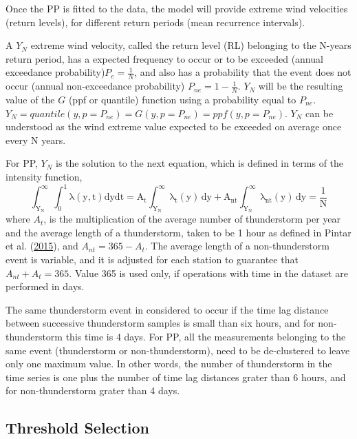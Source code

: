 \documentclass[12pt,oneside]{reedthesis}
\begin{document}
Once the PP is fitted to the data, the model will provide extreme wind velocities (return levels), for different return periods (mean recurrence intervals).

A \(Y_N\) extreme wind velocity, called the return level (RL) belonging to the N-years return period, has a expected frequency to occur or to be exceeded (annual exceedance probability)\(P_e = \frac{1}{N}\), and also has a probability that the event does not occur (annual non-exceedance probability) \(P_{ne}=1-\frac{1}{N}\). \(Y_N\) will be the resulting value of the \(G\) (ppf or quantile) function using a probability equal to \(P_{ne}\). \(Y_N=quantile(y, p=P_{ne})=G(y,p=P_{ne})=ppf(y,p=P_{ne})\). \(Y_N\) can be understood as the wind extreme value expected to be exceeded on average once every N years.

For PP, \(Y_N\) is the solution to the next equation, which is defined in terms of the intensity function,
\begin{equation}
  \mathrm{
          \int_{Y_N}^{\infty}\int_0^1\lambda\left( y,t\right)dydt = A_t\int_{Y_N}^{\infty}\lambda_t\left( y\right)\,dy + A_{nt}\int_{Y_N}^{\infty}\lambda_{nt}\left( y\right)\,dy = \frac{1}{N}
         }
  \label{eq:pprl}
\end{equation}
where \(A_t\), is the multiplication of the average number of thunderstorm per year and the average length of a thunderstorm, taken to be 1 hour as defined in Pintar et al. (\protect\hyperlink{ref-Pintar2015}{2015}), and \(A_{nt} = 365 - A_t\). The average length of a non-thunderstorm event is variable, and it is adjusted for each station to guarantee that \(A_{nt} + A_t = 365\). Value 365 is used only, if operations with time in the dataset are performed in days.

The same thunderstorm event in considered to occur if the time lag distance between successive thunderstorm samples is small than six hours, and for non-thunderstorm this time is 4 days. For PP, all the measurements belonging to the same event (thunderstorm or non-thunderstorm), need to be de-clustered to leave only one maximum value. In other words, the number of thunderstorm in the time series is one plus the number of time lag distances grater than 6 hours, and for non-thunderstorm grater than 4 days.

\hypertarget{thresholdselection}{%
\subsection{Threshold Selection}\label{thresholdselection}}
\end{document}

